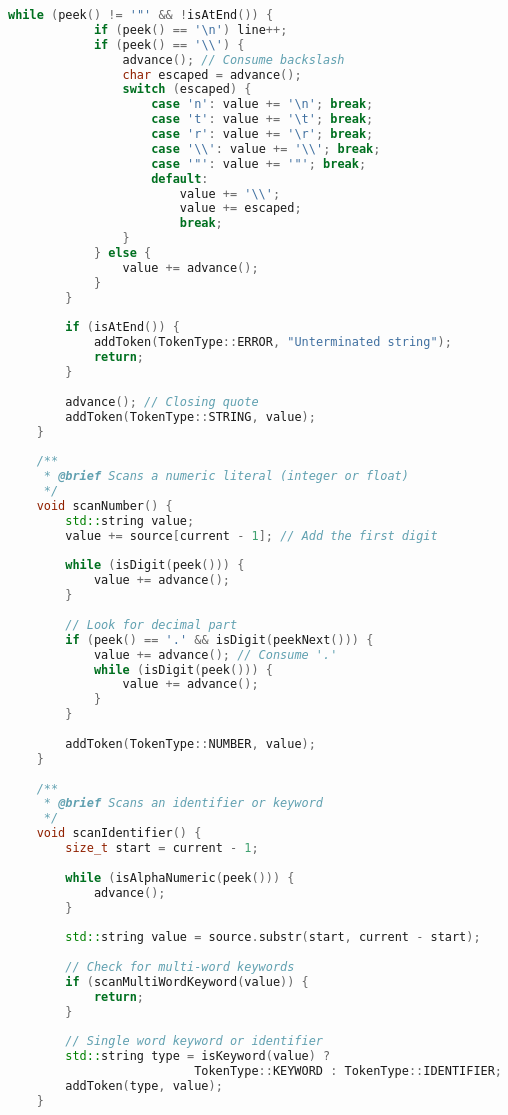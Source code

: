 \documentclass[12pt,a4paper]{article}
\begin{document}
\begin{lstlisting}[language=C++, caption=Lexical Analyzer Implementation]
        while (peek() != '"' && !isAtEnd()) {
            if (peek() == '\n') line++;
            if (peek() == '\\') {
                advance(); // Consume backslash
                char escaped = advance();
                switch (escaped) {
                    case 'n': value += '\n'; break;
                    case 't': value += '\t'; break;
                    case 'r': value += '\r'; break;
                    case '\\': value += '\\'; break;
                    case '"': value += '"'; break;
                    default: 
                        value += '\\';
                        value += escaped;
                        break;
                }
            } else {
                value += advance();
            }
        }
        
        if (isAtEnd()) {
            addToken(TokenType::ERROR, "Unterminated string");
            return;
        }
        
        advance(); // Closing quote
        addToken(TokenType::STRING, value);
    }
    
    /**
     * @brief Scans a numeric literal (integer or float)
     */
    void scanNumber() {
        std::string value;
        value += source[current - 1]; // Add the first digit
        
        while (isDigit(peek())) {
            value += advance();
        }
        
        // Look for decimal part
        if (peek() == '.' && isDigit(peekNext())) {
            value += advance(); // Consume '.'
            while (isDigit(peek())) {
                value += advance();
            }
        }
        
        addToken(TokenType::NUMBER, value);
    }
    
    /**
     * @brief Scans an identifier or keyword
     */
    void scanIdentifier() {
        size_t start = current - 1;
        
        while (isAlphaNumeric(peek())) {
            advance();
        }
        
        std::string value = source.substr(start, current - start);
        
        // Check for multi-word keywords
        if (scanMultiWordKeyword(value)) {
            return;
        }
        
        // Single word keyword or identifier
        std::string type = isKeyword(value) ? 
                          TokenType::KEYWORD : TokenType::IDENTIFIER;
        addToken(type, value);
    }
    

\end{lstlisting}
\end{document}
